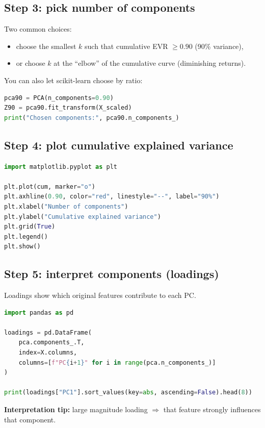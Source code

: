 \documentclass[11pt]{article}
\begin{document}
\subsection{Step 3: pick number of components}
Two common choices:
\begin{itemize}[leftmargin=*]
  \item choose the smallest $k$ such that cumulative EVR $\ge 0.90$ (90\% variance),
  \item or choose $k$ at the ``elbow'' of the cumulative curve (diminishing returns).
\end{itemize}
You can also let scikit-learn choose by ratio:
\begin{lstlisting}[language=Python]
pca90 = PCA(n_components=0.90)
Z90 = pca90.fit_transform(X_scaled)
print("Chosen components:", pca90.n_components_)
\end{lstlisting}

\subsection{Step 4: plot cumulative explained variance}
\begin{lstlisting}[language=Python]
import matplotlib.pyplot as plt

plt.plot(cum, marker="o")
plt.axhline(0.90, color="red", linestyle="--", label="90%")
plt.xlabel("Number of components")
plt.ylabel("Cumulative explained variance")
plt.grid(True)
plt.legend()
plt.show()
\end{lstlisting}

\subsection{Step 5: interpret components (loadings)}
Loadings show which original features contribute to each PC.
\begin{lstlisting}[language=Python]
import pandas as pd

loadings = pd.DataFrame(
    pca.components_.T,
    index=X.columns,
    columns=[f"PC{i+1}" for i in range(pca.n_components_)]
)

print(loadings["PC1"].sort_values(key=abs, ascending=False).head(8))
\end{lstlisting}
\textbf{Interpretation tip:} large magnitude loading $\Rightarrow$ that feature strongly influences that component.
\end{document}
